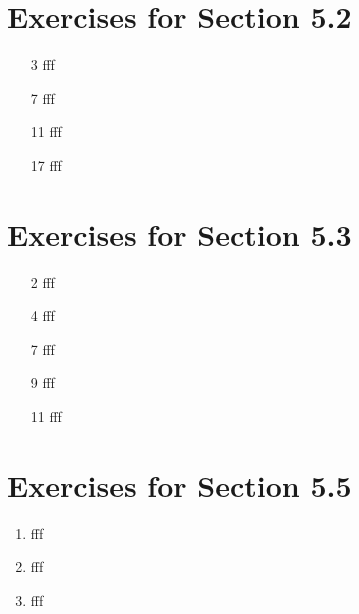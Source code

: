 \documentclass[12pt]{article}
\begin{document}
\section*{Exercises for Section 5.2}
\begin{enumerate}
    \item [3] fff
    \item [7] fff
    \item [11] fff
    \item [17] fff
\end{enumerate}
\section*{Exercises for Section 5.3}
\begin{enumerate}
    \item [2] fff
    \item [4] fff
    \item [7] fff
    \item [9] fff
    \item [11] fff
\end{enumerate}
\section*{Exercises for Section 5.5}
\begin{enumerate}
    \item fff
    \item fff
    \item fff
\end{enumerate}
\end{document}
